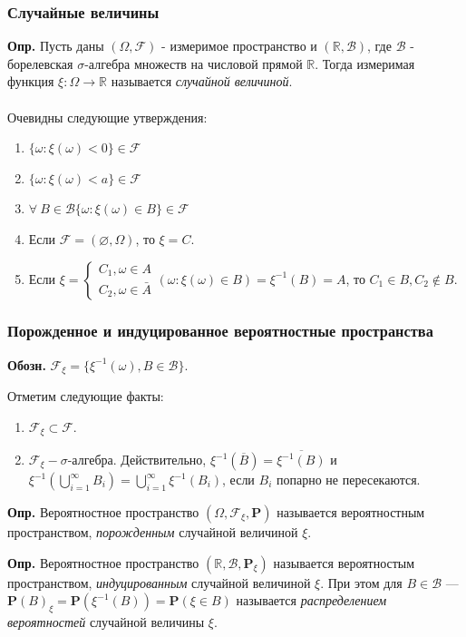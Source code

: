 \documentclass[oneside,final,14pt]{extreport}
\newcommand\mydef{{\bf Опр.}}
\newcommand\myprob[1]{{\mathbf{P}(#1)}}
\newcommand\mydes{{\bf Обозн.}}
\theoremstyle{definition}
\begin{document}
\subsubsection{Случайные величины}
\mydef{} Пусть даны $(\Omega, \mathcal{F})$ - измеримое пространство и $(\mathbb{R}, \mathcal{B})$, где $\mathcal{B}$ - борелевская $\sigma$-алгебра множеств на числовой прямой $\mathbb{R}$. Тогда измеримая функция $\xi: \Omega \to \mathbb{R}$ называется {\it случайной величиной}.
\\
\\
Очевидны следующие утверждения: 
\begin{enumerate}
    \item $\{\omega: \xi(\omega) < 0\} \in \mathcal{F}$
    \item $\{\omega: \xi(\omega) < a\} \in \mathcal{F}$
    \item $\forall~B \in \mathcal{B} \{\omega: \xi(\omega) \in B\} \in \mathcal{F}$
    \item Если $\mathcal{F} = (\varnothing, \Omega)$, то $\xi = C$.
    \item Если $\xi=\left\{\begin{array}{l}C_{1}, \omega \in A \\ C_{2}, \omega \in \bar{A}\end{array}(\omega: \xi(\omega) \in B)=\xi^{-1}(B)=A\right.$, то $C_{1}\in B, C_2 \notin B.$
\end{enumerate}
\subsubsection{Порожденное и индуцированное вероятностные пространства}
\mydes{} $\mathcal{F}_\xi = \{ \xi^{-1}(\omega), B \in \mathcal{B} \}.$

Отметим следующие факты:
\begin{enumerate}
    \item $\mathcal{F}_\xi \subset \mathcal{F}.$
    \item $\mathcal{F}_\xi - \sigma$-алгебра. Действительно, $\xi^{-1}(\overline{B}) = \overline{\xi^{-1}(B)}$ и $\xi^{-1}\left(\bigcup\limits_{i=1}^{\infty}B_i\right) = \bigcup\limits_{i=1}^\infty \xi^{-1}(B_i)$, если $B_i$ попарно не пересекаются.
\end{enumerate}

\mydef{} Вероятностное пространство $(\Omega,\mathcal{F}_\xi,\mathbf{P})$ называется вероятностным пространством, {\it порожденным} случайной величиной $\xi$.

\mydef{} Вероятностное пространство $(\mathbb{R},\mathcal{B},\mathbf{P}_\xi)$ называется вероятностым пространством, {\it индуцированным} случайной величиной $\xi$. При этом для $B \in \mathcal{B}$ --- $\myprob{B}_\xi = \myprob{\xi^{-1}(B)} = \myprob{\xi \in B}$ называется {\it распределением вероятностей} случайной величины $\xi$.
\end{document}
